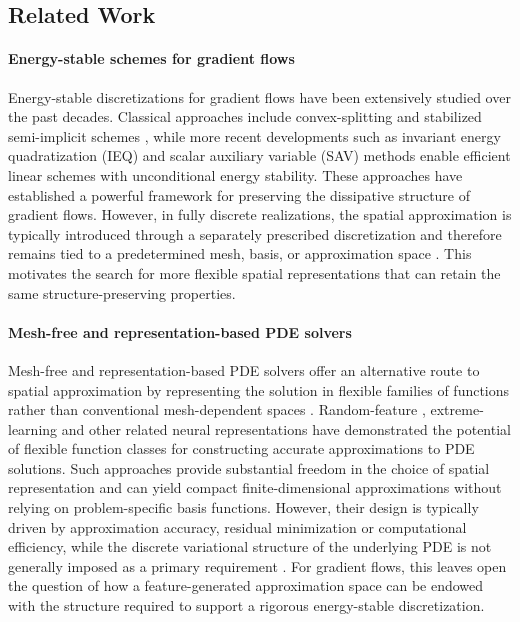 \documentclass[10pt,reqno]{amsart}
\theoremstyle{remark}
\theoremstyle{definition}
\let\originalparagraph\paragraph
\renewcommand{\paragraph}[1]{\originalparagraph{\textbf{#1}}}
\begin{document}
\subsection{Related Work}

\paragraph{Energy-stable schemes for gradient flows}
Energy-stable discretizations for gradient flows have been extensively studied over the past decades. Classical approaches include convex-splitting \cite{Eyre_1998,BaskaranConvex2013} and stabilized semi-implicit schemes \cite{Yang2009AllenCahn,LiSemiImplicitFourierSpectral,WangYu2018CahnHilliard}, while more recent developments such as invariant energy quadratization (IEQ) \cite{YangIEQ2018SISC,YangIEQ2017MMAMAS,YANG2017104JCP,ZhaoIEQ2017IJNME} and scalar auxiliary variable (SAV) \cite{SHEN2018407,SHENXU20182895,ChengMSAV2018SISC,HuangSAV2020SISC,HOU2019307} methods enable efficient linear schemes with unconditional energy stability. These approaches have established a powerful framework for preserving the dissipative structure of gradient flows. However, in fully discrete realizations, the spatial approximation is typically introduced through a separately prescribed discretization and therefore remains tied to a predetermined mesh, basis, or approximation space \cite{GongSAV2018SISC,HanBrylevYang2017}. This motivates the search for more flexible spatial representations that can retain the same structure-preserving properties.

\paragraph{Mesh-free and representation-based PDE solvers}
Mesh-free and representation-based PDE solvers offer an alternative route to spatial approximation by representing the solution in flexible families of functions rather than conventional mesh-dependent spaces \cite{Belytschko1994IJNME,chen2022JML,SIRIGNANO20181339}. Random-feature \cite{CHI2024116719,SHANG2023107518,SUN2024115830,chen2023}, extreme-learning \cite{CALABRO2021,DWIVEDI202096,DONG2021114129,QUAN2023697} and other related neural representations \cite{RAISSI2019686,EYu2018DeepRitz,KHARAZMI2021113547} have demonstrated the potential of flexible function classes for constructing accurate approximations to PDE solutions. Such approaches provide substantial freedom in the choice of spatial representation and can yield compact finite-dimensional approximations without relying on problem-specific basis functions. However, their design is typically driven by approximation accuracy, residual minimization or computational efficiency, while the discrete variational structure of the underlying PDE is not generally imposed as a primary requirement \cite{tang2026energy,wang2026pinns}. For gradient flows, this leaves open the question of how a feature-generated approximation space can be endowed with the structure required to support a rigorous energy-stable discretization.
\end{document}
